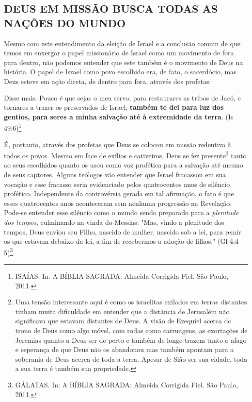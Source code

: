 \documentclass[
    article,            %
	12pt,				%
	oneside,			%
	a4paper,			%
	chapter=TITLE,		%
	section=TITLE,		%
	english,			%
	french,				%
	spanish,			%
	brazil				%
	]{abntex2}
\begin{document}
\subsection{DEUS EM MISSÃO BUSCA TODAS AS NAÇÕES DO MUNDO}
Mesmo com este entendimento da eleição de Israel e a conclusão comum de que temos em enxergar o papel missionário de Israel como um movimento de fora para dentro, não podemos entender que este também é o movimento de Deus na história. O papel de Israel como povo escolhido era, de fato, o sacerdócio, mas Deus esteve em ação direta, de dentro para fora, através dos profetas:
\begin{citacao}
Disse mais: Pouco é que sejas o meu servo, para restaurares as tribos de Jacó, e tornares a trazer os preservados de Israel; \textbf{também te dei para luz dos gentios, para seres a minha salvação até à extremidade da terra}. (Is 49:6)\footnote{ISAÍAS. In: A BÍBLIA SAGRADA: Almeida Corrigida Fiel. São Paulo, 2011.}
\end{citacao}
É, portanto, através dos profetas que Deus se colocou em missão redentiva à todos os povos. Mesmo em face de exílios e cativeiros, Deus se fez presente\footnote{Uma tensão interessante aqui é como os israelitas exilados em terras distantes tinham muita dificuldade em entender que a distância de Jerusalém não significava que estavam distantes de Deus. A visão de Ezequiel acerca do trono de Deus como algo móvel, com rodas como carruagens, as exortações de Jeremias quanto a Deus ser de perto e também de longe trazem tanto o afago e esperança de que Deus não os abandonou mas também apontam para a soberania de Deus acerca de toda a terra. Apesar de Sião ser sua cidade, toda a sua terra é também sua propriedade.} tanto ao seus escolhidos quanto os usou como voz profética para a salvação até mesmo de seus captores. Alguns teólogos vão entender que Israel fracassou em sua vocação e esse fracasso seria evidenciado pelos quatrocentos anos de silêncio profético. Independente da controvérsia gerada em tal afirmação, o fato é que esses quatrocentos anos aconteceram sem nenhuma progressão na Revelação. Pode-se entender esse silêncio como o mundo sendo preparado para a \emph{plenitude dos tempos}, culminando na vinda do Messias: "Mas, vindo a plenitude dos tempos, Deus enviou seu Filho, nascido de mulher, nascido sob a lei, para remir os que estavam debaixo da lei, a fim de recebermos a adoção de filhos." (Gl 4:4-5)\footnote{GÁLATAS. In: A BÍBLIA SAGRADA: Almeida Corrigida Fiel. São Paulo, 2011.}.

\end{document}
